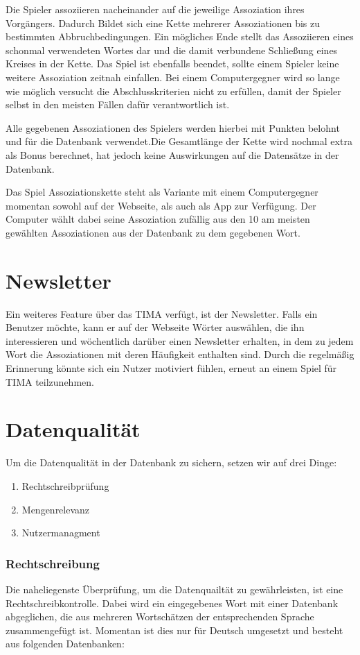 Die Spieler assoziieren nacheinander auf die jeweilige Assoziation ihres
Vorgängers. Dadurch Bildet sich eine Kette mehrerer Assoziationen bis
zu bestimmten Abbruchbedingungen. Ein mögliches Ende stellt das Assoziieren
eines schonmal verwendeten Wortes dar und die damit verbundene Schließung eines
Kreises in der Kette. Das Spiel ist ebenfalls beendet, sollte einem Spieler
keine weitere Assoziation zeitnah einfallen. Bei einem Computergegner wird
so lange wie möglich versucht die Abschlusskriterien nicht zu erfüllen, damit
der Spieler selbst in den meisten Fällen dafür verantwortlich ist.

Alle gegebenen Assoziationen des Spielers werden hierbei mit Punkten belohnt
und für die Datenbank verwendet.Die Gesamtlänge der Kette wird nochmal extra
als Bonus berechnet, hat jedoch keine Auswirkungen auf die Datensätze in der
Datenbank.

Das Spiel Assoziationskette steht als Variante mit einem Computergegner momentan sowohl auf der Webseite, als auch als App zur Verfügung. Der Computer wählt dabei seine Assoziation zufällig aus den 10 am meisten gewählten Assoziationen aus der Datenbank zu dem gegebenen Wort.

\section{Newsletter}\label{subsec:newsletter}
Ein weiteres Feature über das TIMA verfügt, ist der Newsletter. Falls ein Benutzer möchte, kann er auf der Webseite Wörter auswählen, die ihn interessieren und wöchentlich darüber einen Newsletter erhalten, in dem zu jedem Wort die Assoziationen mit deren Häufigkeit enthalten sind. Durch die regelmäßig Erinnerung könnte sich ein Nutzer motiviert fühlen, erneut an einem Spiel für TIMA teilzunehmen.

\section{Datenqualität}
Um die Datenqualität  in der Datenbank zu sichern, setzen wir auf drei Dinge:

\begin{enumerate}
	\item Rechtschreibprüfung
	\item Mengenrelevanz
	\item Nutzermanagment
\end{enumerate}

\subsubsection{Rechtschreibung}
Die naheliegenste Überprüfung, um die Datenquailtät zu gewährleisten, ist eine Rechtschreibkontrolle. Dabei wird ein eingegebenes Wort mit einer Datenbank abgeglichen, die aus mehreren Wortschätzen der entsprechenden Sprache zusammengefügt ist. Momentan ist dies nur für Deutsch umgesetzt und besteht aus folgenden Datenbanken: %

